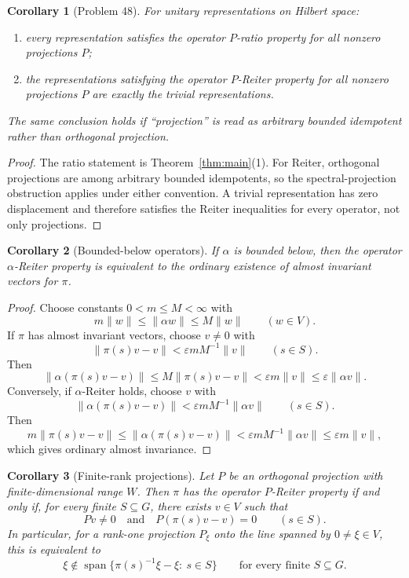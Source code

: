 \documentclass[11pt]{article}
\newtheorem{corollary}{Corollary}
\newcommand{\eps}{\varepsilon}
\newcommand{\spanop}{\operatorname{span}}
\begin{document}
\begin{corollary}[Problem 48]
For unitary representations on Hilbert space:
\begin{enumerate}
\item every representation satisfies the operator $P$-ratio property for all
nonzero projections $P$;
\item the representations satisfying the operator $P$-Reiter property for all
nonzero projections $P$ are exactly the trivial representations.
\end{enumerate}
The same conclusion holds if ``projection'' is read as arbitrary bounded
idempotent rather than orthogonal projection.
\end{corollary}

\begin{proof}
The ratio statement is Theorem~\ref{thm:main}(1).  For Reiter, orthogonal
projections are among arbitrary bounded idempotents, so the spectral-projection
obstruction applies under either convention.  A trivial representation has
zero displacement and therefore satisfies the Reiter inequalities for every
operator, not only projections.
\end{proof}

\begin{corollary}[Bounded-below operators]
If $\alpha$ is bounded below, then the operator $\alpha$-Reiter property is
equivalent to the ordinary existence of almost invariant vectors for $\pi$.
\end{corollary}

\begin{proof}
Choose constants $0<m\leq M<\infty$ with
\[
  m\|w\|\leq \|\alpha w\|\leq M\|w\|\qquad(w\in V).
\]
If $\pi$ has almost invariant vectors, choose $v\neq0$ with
\[
  \|\pi(s)v-v\|<\eps mM^{-1}\|v\|\qquad(s\in S).
\]
Then
\[
  \|\alpha(\pi(s)v-v)\|\leq M\|\pi(s)v-v\|
  <\eps m\|v\|\leq \eps\|\alpha v\|.
\]
Conversely, if $\alpha$-Reiter holds, choose $v$ with
\[
  \|\alpha(\pi(s)v-v)\|<\eps mM^{-1}\|\alpha v\|\qquad(s\in S).
\]
Then
\[
  m\|\pi(s)v-v\|\leq \|\alpha(\pi(s)v-v)\|
  <\eps mM^{-1}\|\alpha v\|\leq \eps m\|v\|,
\]
which gives ordinary almost invariance.
\end{proof}

\begin{corollary}[Finite-rank projections]
Let $P$ be an orthogonal projection with finite-dimensional range $W$.  Then
$\pi$ has the operator $P$-Reiter property if and only if, for every finite
$S\subseteq G$, there exists $v\in V$ such that
\[
  Pv\neq0
  \quad\text{and}\quad
  P(\pi(s)v-v)=0\qquad(s\in S).
\]
In particular, for a rank-one projection $P_\xi$ onto the line spanned by
$0\neq\xi\in V$, this is equivalent to
\[
  \xi\notin
  \spanop\{\pi(s)^{-1}\xi-\xi:\ s\in S\}
  \qquad\text{for every finite }S\subseteq G.
\]
\end{corollary}
\end{document}
